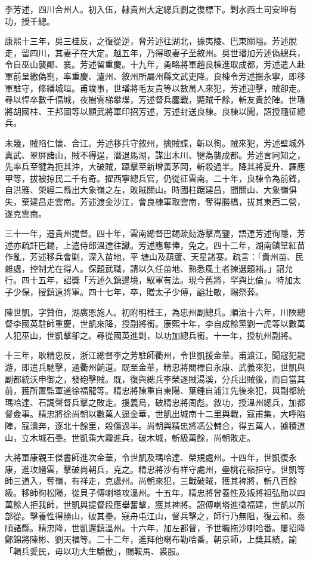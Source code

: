 \begin{pinyinscope}
李芳述，四川合州人。初入伍，隸貴州大定總兵劉之復標下。剿水西土司安坤有功，授千總。

康熙十三年，吳三桂反，之復從逆，脅芳述往湖北，據夷陵、巴東關隘。芳述脫走，留四川，其妻子在大定。越五年，乃得取妻子至敘州。吳世璠加芳述偽總兵，令自巫山襲鄖、襄。芳述留重慶。十九年，勇略將軍趙良棟進取成都，芳述遣人赴軍前呈繳偽劄，率重慶、瀘州、敘州所屬州縣文武吏降。良棟令芳述撫永寧，即移軍駐守，修繕城垣。甫竣事，世璠將毛友貴等以數萬人來犯，芳述迎擊，賊卻走。尋以悍卒數千偪城，夜樹雲梯攀堞，芳述督兵鏖戰，斃賊千餘，斬友貴於陣。世璠將胡國柱、王邦圖等以顯武將軍印招芳述，芳述封送良棟。良棟以聞，詔授隨征總兵。

未幾，賊陷仁懷、合江。芳述移兵守敘州，擒賊諜，斬以徇。賊來犯，芳述壁城外真武、翠屏諸山，賊不得逞，潛退馬湖，謀出木川、犍為襲成都。芳述言冋知之，先率兵至犍為扼其沖，大破賊，躡擊至新增黃茅岡，斬殺過半。降其將夏升、羅應甲等，拔被掠民二千有奇。擢西寧總兵官，仍從征雲南。二十年，良棟令為前鋒，自洪雅、榮經二縣出大象嶺之左，敗賊關山。時國柱踞建昌，聞關山、大象嶺俱失，棄建昌走雲南。芳述渡金沙江，會良棟軍取雲南，奪得勝橋，拔其東西二營，遂克雲南。

三十一年，遷貴州提督。四十年，雲南總督巴錫疏劾游擊高鑒，語連芳述徇隱，芳述亦疏訐巴錫，上遣侍郎溫達往讞。芳述應奪俸，免之。四十二年，湖南鎮筸紅苗作亂，芳述移兵會剿，深入苗地，平塘山及葫蘆、天星諸寨。疏言：「貴州苗、民雜處，控制尤在得人。保題武職，請以久任苗地、熟悉風土者揀選題補。」詔允行。四十五年，詔獎「芳述久鎮邊境，馭軍有法。現今舊將，罕與比倫」。特加太子少保，授鎮遠將軍。四十七年，卒，贈太子少傅，謚壯敏，賜祭葬。

陳世凱，字贊伯，湖廣恩施人。初附明桂王，為忠州副總兵。順治十六年，川陜總督李國英駐師重慶，世凱來降，授副將銜。康熙十年，李自成餘黨劉一虎等以數萬人犯巫山，世凱擊卻之。尋從國英進剿，以功加總兵銜。十一年，授杭州副將。

十三年，耿精忠反，浙江總督李之芳駐師衢州，令世凱援金華。甫渡江，聞寇犯龍游，即遣兵馳擊，通衢州餉道。既至金華，精忠將閻標自永康、武義來犯，世凱與副都統沃申御之，發砲擊賊。既，復與總兵李榮逐賊湯溪，分兵出賊後，而自當其前，獲所置監軍道徐福龍等。精忠將陳重自東陽、葉鍾自浦江先後來犯，與副都統瑪哈達、石調聲督兵擊之敗走。援義烏，破精忠將周彪。敘功，授溫州總兵，加都督僉事。精忠將徐尚朝以數萬人逼金華，世凱出城南十二里與戰，寇甫集，大呼陷陣，寇潰奔，逐北十餘里，殺傷過半。尚朝與精忠將馮公輔合，得五萬人，據積道山，立木城石壘。世凱乘大霧進兵，破木城，斬級萬餘，尚朝敗走。

大將軍康親王傑書師進次金華，令世凱及瑪哈達、榮規處州。十四年，世凱復永康，進攻縉雲，擊破尚朝兵，克之。精忠將沙有祥守處州，壘桃花嶺拒守。世凱等師三道入，奪嶺，有祥走，克處州。尚朝來犯，三戰破賊，獲其裨將，斬八百餘級。移師徇松陽，從貝子傅喇塔攻溫州。十五年，精忠將曾養性及叛將祖弘勛以四萬餘人拒我師，世凱與提督段應舉奮擊，獲其裨將。詔傅喇塔進徵福建，世凱以所部從。擊養性得勝山，破其壘。寇舟屯江山，督兵擊之，師行乃無阻，復云和、泰順諸縣。精忠降，世凱還鎮溫州。十六年，加左都督，予世職拖沙喇哈番。屢招降鄭錦將陳彬、劉天福等。二十二年，進拜他喇布勒哈番。朝京師，上獎其績，諭「輯兵愛民，毋以功大生驕傲」，賜鞍馬、裘服。


\end{pinyinscope}
